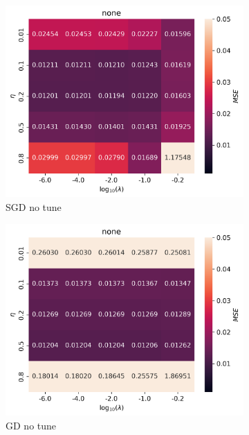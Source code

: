 \documentclass[11pt]{article}
\begin{document}
\begin{figure}[H]
  \begin{subfigure}{.5\textwidth}
    \centering
    \includegraphics[width=\textwidth]{../figures/none_SGD_eta_lmb.png}
    \caption{SGD no tune}
    \label{fig:}
  \end{subfigure}
  \begin{subfigure}{.5\textwidth}
    \centering
    \includegraphics[width=\textwidth]{../figures/none_GD_eta_lmb.png}
    \caption{GD no tune}
    \label{fig:}
  \end{subfigure}
  \begin{subfigure}{.5\textwidth}

\end{subfigure}
\end{figure}
\end{document}
